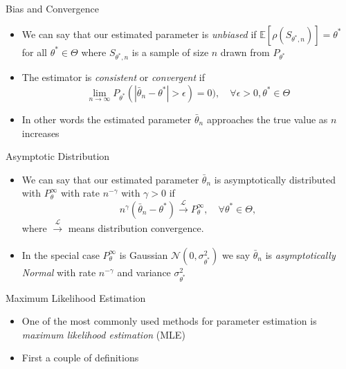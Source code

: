 \documentclass{beamer}
\begin{document}
\begin{frame}{Bias and Convergence}  
\begin{itemize} 
\item We can say that our estimated parameter is \emph{unbiased} if $\mathbb{E}[\rho(S_{\theta^*,n})] = \theta^*$ for all $\theta^* \in \Theta$ where $S_{\theta^*,n}$ is a sample of size $n$ drawn from $P_{\theta^*}$ 
\item The estimator is \emph{consistent} or \emph{convergent} if 
\begin{displaymath} 
 \lim_{n \rightarrow \infty} P_{\theta^*}(|\bar{\theta}_n - \theta^*| > \epsilon) = 0), \quad \forall \epsilon > 0, \theta^* \in \Theta 
\end{displaymath}
\item In other words the estimated parameter $\bar{\theta}_n$ approaches the true value as $n$ increases 
\end{itemize}
\end{frame}

\begin{frame}{Asymptotic Distribution} 
\begin{itemize} 
 \item We can say that our estimated parameter $\bar{\theta}_n$ is asymptotically distributed with $P_\theta^\infty$ with rate $n^{-\gamma}$ with $\gamma > 0$ if 
 \begin{displaymath}
  n^\gamma(\bar{\theta}_n - \theta^*) \xrightarrow[]{\mathcal{L}} P_\theta^\infty, \quad \forall  \theta^* \in \Theta, 
 \end{displaymath}
where $\xrightarrow[]{\mathcal{L}}$ means distribution convergence. 
\item In the special case $P_\theta^\infty$ is Gaussian $\mathcal{N}(0, \sigma^2_{\theta^*})$ we say $\bar{\theta}_n$ is \emph{asymptotically Normal} with rate $n^{-\gamma}$ and variance $\sigma^2_{\theta^*}$ 
\end{itemize}
\end{frame}

\begin{frame}{Maximum Likelihood Estimation} 
\begin{itemize} 
 \item One of the most commonly used methods for parameter estimation is \emph{maximum likelihood estimation} (MLE) 
 \item First a couple of definitions 
 \begin{displaymath}
  
 \end{displaymath}

\end{itemize}
 
\end{frame}
\end{document}
